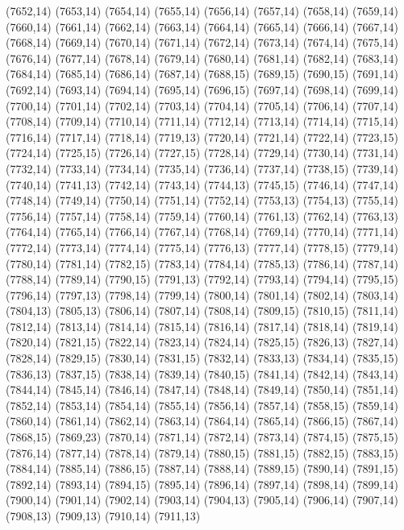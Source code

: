 (7652,14)
(7653,14)
(7654,14)
(7655,14)
(7656,14)
(7657,14)
(7658,14)
(7659,14)
(7660,14)
(7661,14)
(7662,14)
(7663,14)
(7664,14)
(7665,14)
(7666,14)
(7667,14)
(7668,14)
(7669,14)
(7670,14)
(7671,14)
(7672,14)
(7673,14)
(7674,14)
(7675,14)
(7676,14)
(7677,14)
(7678,14)
(7679,14)
(7680,14)
(7681,14)
(7682,14)
(7683,14)
(7684,14)
(7685,14)
(7686,14)
(7687,14)
(7688,15)
(7689,15)
(7690,15)
(7691,14)
(7692,14)
(7693,14)
(7694,14)
(7695,14)
(7696,15)
(7697,14)
(7698,14)
(7699,14)
(7700,14)
(7701,14)
(7702,14)
(7703,14)
(7704,14)
(7705,14)
(7706,14)
(7707,14)
(7708,14)
(7709,14)
(7710,14)
(7711,14)
(7712,14)
(7713,14)
(7714,14)
(7715,14)
(7716,14)
(7717,14)
(7718,14)
(7719,13)
(7720,14)
(7721,14)
(7722,14)
(7723,15)
(7724,14)
(7725,15)
(7726,14)
(7727,15)
(7728,14)
(7729,14)
(7730,14)
(7731,14)
(7732,14)
(7733,14)
(7734,14)
(7735,14)
(7736,14)
(7737,14)
(7738,15)
(7739,14)
(7740,14)
(7741,13)
(7742,14)
(7743,14)
(7744,13)
(7745,15)
(7746,14)
(7747,14)
(7748,14)
(7749,14)
(7750,14)
(7751,14)
(7752,14)
(7753,13)
(7754,13)
(7755,14)
(7756,14)
(7757,14)
(7758,14)
(7759,14)
(7760,14)
(7761,13)
(7762,14)
(7763,13)
(7764,14)
(7765,14)
(7766,14)
(7767,14)
(7768,14)
(7769,14)
(7770,14)
(7771,14)
(7772,14)
(7773,14)
(7774,14)
(7775,14)
(7776,13)
(7777,14)
(7778,15)
(7779,14)
(7780,14)
(7781,14)
(7782,15)
(7783,14)
(7784,14)
(7785,13)
(7786,14)
(7787,14)
(7788,14)
(7789,14)
(7790,15)
(7791,13)
(7792,14)
(7793,14)
(7794,14)
(7795,15)
(7796,14)
(7797,13)
(7798,14)
(7799,14)
(7800,14)
(7801,14)
(7802,14)
(7803,14)
(7804,13)
(7805,13)
(7806,14)
(7807,14)
(7808,14)
(7809,15)
(7810,15)
(7811,14)
(7812,14)
(7813,14)
(7814,14)
(7815,14)
(7816,14)
(7817,14)
(7818,14)
(7819,14)
(7820,14)
(7821,15)
(7822,14)
(7823,14)
(7824,14)
(7825,15)
(7826,13)
(7827,14)
(7828,14)
(7829,15)
(7830,14)
(7831,15)
(7832,14)
(7833,13)
(7834,14)
(7835,15)
(7836,13)
(7837,15)
(7838,14)
(7839,14)
(7840,15)
(7841,14)
(7842,14)
(7843,14)
(7844,14)
(7845,14)
(7846,14)
(7847,14)
(7848,14)
(7849,14)
(7850,14)
(7851,14)
(7852,14)
(7853,14)
(7854,14)
(7855,14)
(7856,14)
(7857,14)
(7858,15)
(7859,14)
(7860,14)
(7861,14)
(7862,14)
(7863,14)
(7864,14)
(7865,14)
(7866,15)
(7867,14)
(7868,15)
(7869,23)
(7870,14)
(7871,14)
(7872,14)
(7873,14)
(7874,15)
(7875,15)
(7876,14)
(7877,14)
(7878,14)
(7879,14)
(7880,15)
(7881,15)
(7882,15)
(7883,15)
(7884,14)
(7885,14)
(7886,15)
(7887,14)
(7888,14)
(7889,15)
(7890,14)
(7891,15)
(7892,14)
(7893,14)
(7894,15)
(7895,14)
(7896,14)
(7897,14)
(7898,14)
(7899,14)
(7900,14)
(7901,14)
(7902,14)
(7903,14)
(7904,13)
(7905,14)
(7906,14)
(7907,14)
(7908,13)
(7909,13)
(7910,14)
(7911,13)
